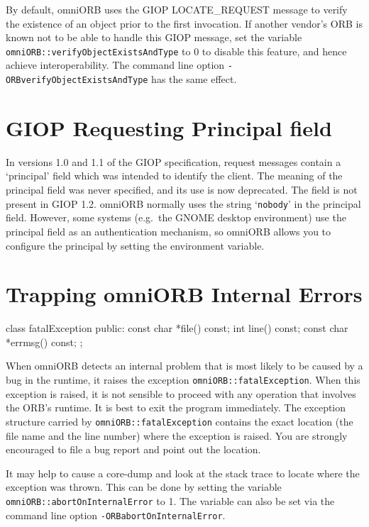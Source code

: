 \documentclass[11pt,twoside,a4paper]{book}
\newcommand{\type}[1]{\texttt{#1}}
\newcommand{\code}[1]{\texttt{#1}}
\newcommand{\cmdline}[1]{\texttt{#1}}
\newcommand{\envvar}{\begingroup \urlstyle{tt}\Url}
\newcommand{\dsc}{\discretionary{}{}{}}
\begin{document}
By default, omniORB uses the GIOP LOCATE\_REQUEST message to verify
the existence of an object prior to the first invocation. If another
vendor's ORB is known not to be able to handle this GIOP message, set
the variable \code{omniORB::\dsc{}verifyObjectExistsAndType} to 0 to
disable this feature, and hence achieve interoperability. The command
line option \cmdline{-ORBverifyObjectExistsAndType} has the same
effect.


\section{GIOP Requesting Principal field}

In versions 1.0 and 1.1 of the GIOP specification, request messages
contain a `principal' field which was intended to identify the client.
The meaning of the principal field was never specified, and its use is
now deprecated. The field is not present in GIOP 1.2. omniORB normally
uses the string `\texttt{nobody}' in the principal field. However,
some systems (e.g.\ the GNOME desktop environment) use the principal
field as an authentication mechanism, so omniORB allows you to
configure the principal by setting the \envvar{OMNIORB_PRINCIPAL}
environment variable.


\section{Trapping omniORB Internal Errors}
\label{sec_fatal}

\begin{cxxlisting}
class fatalException {
public:
    const char *file() const;
    int line() const;
    const char *errmsg() const;
};
\end{cxxlisting}

When omniORB detects an internal problem that is most likely to be
caused by a bug in the runtime, it raises the exception
\type{omniORB::fatalException}.  When this exception is raised, it is
not sensible to proceed with any operation that involves the ORB's
runtime. It is best to exit the program immediately. The exception
structure carried by \type{omniORB::fatalException} contains the exact
location (the file name and the line number) where the exception is
raised. You are strongly encouraged to file a bug report and point out
the location.

It may help to cause a core-dump and look at the stack trace to locate
where the exception was thrown. This can be done by setting the
variable \code{omniORB::\dsc{}abortOnInternalError} to 1. The variable
can also be set via the command line option
\cmdline{-ORBabortOnInternalError}.
\end{document}
